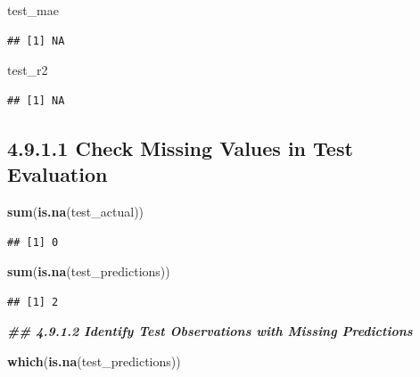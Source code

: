 \documentclass[
]{article}
\newenvironment{Shaded}{\begin{snugshade}}{\end{snugshade}}
\newcommand{\DocumentationTok}[1]{\textcolor[rgb]{0.56,0.35,0.01}{\textbf{\textit{#1}}}}
\newcommand{\FunctionTok}[1]{\textcolor[rgb]{0.13,0.29,0.53}{\textbf{#1}}}
\newcommand{\NormalTok}[1]{#1}
\begin{document}
\begin{Shaded}
\begin{Highlighting}[]
\NormalTok{test\_mae}
\end{Highlighting}
\end{Shaded}

\begin{verbatim}
## [1] NA
\end{verbatim}

\begin{Shaded}
\begin{Highlighting}[]
\NormalTok{test\_r2}
\end{Highlighting}
\end{Shaded}

\begin{verbatim}
## [1] NA
\end{verbatim}

\subsection{4.9.1.1 Check Missing Values in Test
Evaluation}\label{check-missing-values-in-test-evaluation}

\begin{Shaded}
\begin{Highlighting}[]
\FunctionTok{sum}\NormalTok{(}\FunctionTok{is.na}\NormalTok{(test\_actual))}
\end{Highlighting}
\end{Shaded}

\begin{verbatim}
## [1] 0
\end{verbatim}

\begin{Shaded}
\begin{Highlighting}[]
\FunctionTok{sum}\NormalTok{(}\FunctionTok{is.na}\NormalTok{(test\_predictions))}
\end{Highlighting}
\end{Shaded}

\begin{verbatim}
## [1] 2
\end{verbatim}

\begin{Shaded}
\begin{Highlighting}[]
\DocumentationTok{\#\# 4.9.1.2 Identify Test Observations with Missing Predictions}

\FunctionTok{which}\NormalTok{(}\FunctionTok{is.na}\NormalTok{(test\_predictions))}
\end{Highlighting}
\end{Shaded}
\end{document}
